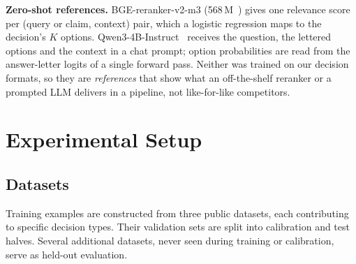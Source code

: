 \documentclass[twocolumn]{ICCKjournal}
\begin{document}
\textbf{Zero-shot references.} BGE-reranker-v2-m3 (568\,M~\cite{bge_m3}) gives one relevance score per (query or claim, context) pair, which a logistic regression maps to the decision's $K$ options. Qwen3-4B-Instruct~\cite{qwen2025qwen3} receives the question, the lettered options and the context in a chat prompt; option probabilities are read from the answer-letter logits of a single forward pass. Neither was trained on our decision formats, so they are \emph{references} that show what an off-the-shelf reranker or a prompted LLM delivers in a pipeline, not like-for-like competitors.

\section{Experimental Setup}
\label{sec:experiments}

\subsection{Datasets}
\label{sec:datasets}
Training examples are constructed from three public datasets, each contributing to specific decision types. Their validation sets are split into calibration and test halves. Several additional datasets, never seen during training or calibration, serve as held-out evaluation.
\end{document}

